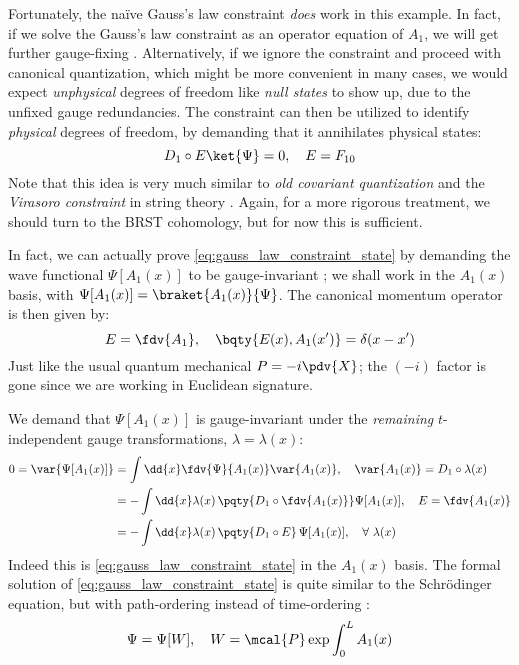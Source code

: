 \documentclass[a4paper
	,10pt
]{article}
\begin{document}
	Fortunately, the na\"ive Gauss's law constraint \textit{does} work in this example. In fact, if we solve the Gauss's law constraint as an operator equation of $A_1$, we will get further gauge-fixing \cite{Hatfield:234595}. 
	Alternatively, if we ignore the constraint and proceed with canonical quantization, which might be more convenient in many cases, we would expect \textit{unphysical} degrees of freedom like \textit{null states} to show up, due to the unfixed gauge redundancies. The constraint can then be utilized to identify \textit{physical} degrees of freedom, by demanding that it annihilates physical states:
	\begin{equation}
		D_1 \circ E \ket{\Psi} = 0,
	\quad E = F_{10}
	\label{eq:gauss_law_constraint_state}
	\end{equation}
	Note that this idea is very much similar to \textit{old covariant quantization} and the \textit{Virasoro constraint} in string theory \cite{Polchinski:1998rq}. Again, for a more rigorous treatment, we should turn to the BRST cohomology, but for now this is sufficient. 
	
	In fact, we can actually prove \eqref{eq:gauss_law_constraint_state} by demanding the wave functional $\Psi[A_1(x)]$ to be gauge-invariant \cite{Hatfield:234595}; we shall work in the $A_1(x)$ basis, with $\Psi[A_1(x)] = \braket{A_1(x)}{\Psi}$. 
	The canonical momentum operator is then given by:
	\begin{equation}
		E = \fdv{A_1},
	\quad
		\bqty{
			E(x), A_1(x')
		} = \delta(x - x')
	\end{equation}
	Just like the usual quantum mechanical $P = - i\pdv{X}$; the $(-i)$ factor is gone since we are working in Euclidean signature. 
	
	We demand that $\Psi[A_1(x)]$ is gauge-invariant under the \textit{remaining} $t$-independent gauge transformations, $\lambda = \lambda(x)$:
	\begin{equation}
	\begin{aligned}
		0 = \var{\Psi[A_1(x)]}
		&= \int \dd{x}
			\fdv{\Psi}{A_1(x)} \var{A_1(x)},
		\quad \var{A_1(x)} = D_1 \circ \lambda(x) \\
		&= -\int \dd{x}
			\lambda(x)\,
			\pqty{D_1 \circ \fdv{A_1(x)}}
			\Psi[A_1(x)],
		\quad E = \fdv{A_1(x)} \\
		&= -\int \dd{x}
			\lambda(x)\,
			\pqty{D_1 \circ E}\,
			\Psi[A_1(x)],
		\quad \forall\ \lambda(x)
	\end{aligned}
	\end{equation}
	Indeed this is \eqref{eq:gauss_law_constraint_state} in the $A_1(x)$ basis. The formal solution of \eqref{eq:gauss_law_constraint_state} is quite similar to the Schr\"odinger equation, but with path-ordering instead of time-ordering \cite{Minahan:1993np}:
	\begin{equation}
		\Psi = \Psi[W],
	\quad
		W = \mcal{P} \exp \int_0^L A_1(x)
	\label{eq:gauss_law_solution}
	\end{equation}
	
\end{document}

